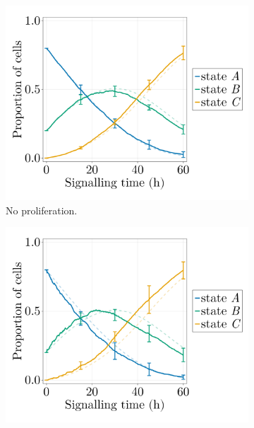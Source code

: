 \begin{figure}[ht]
    \centering
    \begin{subfigure}{0.47\textwidth}
        \centering
        \includegraphics[width=\textwidth]{figures/410/410-adhesion-proportions-10ite-quiet.png}
        \caption{No proliferation.}
        \label{fig:diff-prolif-proportions-avg}
    \end{subfigure}
    \hfill
    \begin{subfigure}{0.47\textwidth}
        \centering
        \includegraphics[width=\textwidth]{figures/411/411-adhesion-proportions-7ite-prolif-equal.png}

\end{subfigure}
\end{figure}
